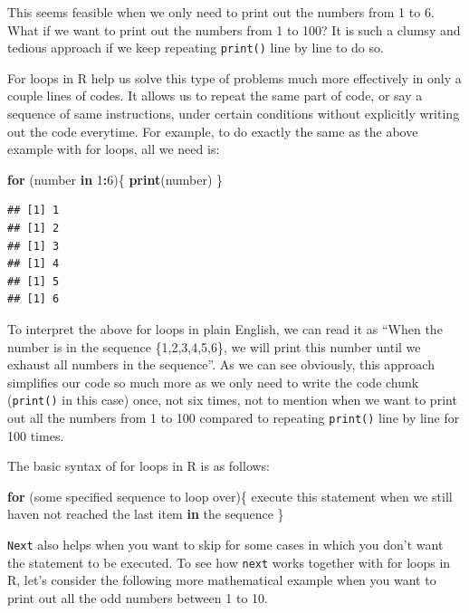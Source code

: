 \documentclass[12pt,]{krantz}
\newenvironment{Shaded}{\begin{snugshade}}{\end{snugshade}}
\newcommand{\KeywordTok}[1]{\textcolor[rgb]{0.27,0.27,0.27}{\textbf{#1}}}
\newcommand{\DecValTok}[1]{\textcolor[rgb]{0.06,0.06,0.06}{#1}}
\newcommand{\ControlFlowTok}[1]{\textcolor[rgb]{0.27,0.27,0.27}{\textbf{#1}}}
\newcommand{\OperatorTok}[1]{\textcolor[rgb]{0.43,0.43,0.43}{\textbf{#1}}}
\newcommand{\NormalTok}[1]{#1}
\begin{document}
This seems feasible when we only need to print out the numbers from 1 to
6. What if we want to print out the numbers from 1 to 100? It is such a
clumsy and tedious approach if we keep repeating \texttt{print()} line
by line to do so.

For loops in R help us solve this type of problems much more effectively
in only a couple lines of codes. It allows us to repeat the same part of
code, or say a sequence of same instructions, under certain conditions
without explicitly writing out the code everytime. For example, to do
exactly the same as the above example with for loops, all we need is:

\begin{Shaded}
\begin{Highlighting}[]
\ControlFlowTok{for}\NormalTok{ (number }\ControlFlowTok{in} \DecValTok{1}\OperatorTok{:}\DecValTok{6}\NormalTok{)\{}
  \KeywordTok{print}\NormalTok{(number)}
\NormalTok{\}}
\end{Highlighting}
\end{Shaded}

\begin{verbatim}
## [1] 1
## [1] 2
## [1] 3
## [1] 4
## [1] 5
## [1] 6
\end{verbatim}

To interpret the above for loops in plain English, we can read it as
``When the number is in the sequence \{1,2,3,4,5,6\}, we will print this
number until we exhaust all numbers in the sequence''. As we can see
obviously, this approach simplifies our code so much more as we only
need to write the code chunk (\texttt{print()} in this case) once, not
six times, not to mention when we want to print out all the numbers from
1 to 100 compared to repeating \texttt{print()} line by line for 100
times.

The basic syntax of for loops in R is as follows:

\begin{Shaded}
\begin{Highlighting}[]
\ControlFlowTok{for}\NormalTok{ (some specified sequence to loop over)\{}
\NormalTok{  execute this statement when we still haven not reached the last item }\ControlFlowTok{in}\NormalTok{ the sequence}
\NormalTok{\}}
\end{Highlighting}
\end{Shaded}

\texttt{Next} also helps when you want to skip for some cases in which
you don't want the statement to be executed. To see how \texttt{next}
works together with for loops in R, let's consider the following more
mathematical example when you want to print out all the odd numbers
between 1 to 10.
\end{document}
